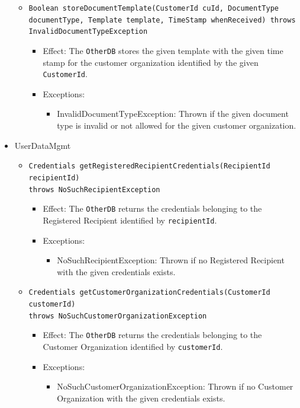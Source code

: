\documentclass[a4paper,10pt]{article}
\begin{document}
\begin{itemize}
\begin{itemize}
   		\item \texttt{Boolean storeDocumentTemplate(CustomerId cuId, DocumentType documentType, Template template, TimeStamp whenReceived) throws InvalidDocumentTypeException}
        \begin{itemize}
            \item Effect: The \texttt{OtherDB} stores the given template with the given time stamp for the customer organization identified by the given \texttt{CustomerId}.
            \item Exceptions:
            \begin{itemize}
            	\item InvalidDocumentTypeException: Thrown if the given document type is invalid or not allowed for the given customer organization.
            \end{itemize}
        \end{itemize}          
        
    \end{itemize}
    
    \item UserDataMgmt
    \begin{itemize}
        \item \texttt{Credentials getRegisteredRecipientCredentials(RecipientId recipientId) \\throws NoSuchRecipientException}
        \begin{itemize}
            \item Effect: The \texttt{OtherDB} returns the credentials belonging to the Registered Recipient identified by \texttt{recipientId}.
            \item Exceptions:
            \begin{itemize}
                \item NoSuchRecipientException: Thrown if no Registered Recipient with the given credentials exists.
            \end{itemize}
		\end{itemize}
            
        \item \texttt{Credentials getCustomerOrganizationCredentials(CustomerId customerId) \\ throws NoSuchCustomerOrganizationException}
        \begin{itemize}
            \item Effect: The \texttt{OtherDB} returns the credentials belonging to the Customer Organization identified by \texttt{customerId}.
            \item Exceptions:
            \begin{itemize}
                \item NoSuchCustomerOrganizationException: Thrown if no Customer Organization with the given credentials exists.
            \end{itemize}
        \end{itemize}
        

\end{itemize}
\end{itemize}
\end{document}
